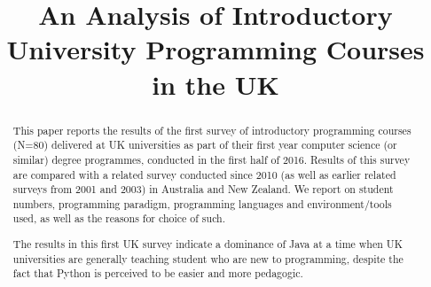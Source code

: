 \documentclass{sig-alternate}
\begin{document}
%

\title{An Analysis of Introductory University Programming Courses in the UK}
\iffalse
\numberofauthors{3}
\author{
\alignauthor
Ellen Murphy\\
\affaddr{Institute for\\Mathematical Innovation}\\
\affaddr{University of Bath}\\
\affaddr{e.murphy@bath.ac.uk}
\alignauthor
Tom Crick\\
\affaddr{Dept. of Computing}\\
\affaddr{Cardiff Metropolitan University}\\
\affaddr{tcrick@cardiffmet.ac.uk}
\alignauthor
James H. Davenport\\
\affaddr{Dept. of Computer Science}\\
\affaddr{University of Bath}\\
\affaddr{j.h.davenport@bath.ac.uk}\\
}
\fi
\maketitle

\begin{abstract}
This paper reports the results of the first survey of introductory
programming courses (N=80) delivered at UK universities as part of
their first year computer science (or similar) degree programmes,
conducted in the first half of 2016. Results of this survey are
compared with a related survey conducted since 2010 (as well as
earlier related surveys from 2001 and 2003) in Australia and New
Zealand. We report on student numbers, programming paradigm,
programming languages and environment/tools used, as well as the
reasons for choice of such.


The results in this first UK survey indicate a dominance of Java at a time when UK universities are
generally teaching student who are new to programming, despite the fact that Python is perceived to be easier and more pedagogic.

\end{abstract}
\end{document}
